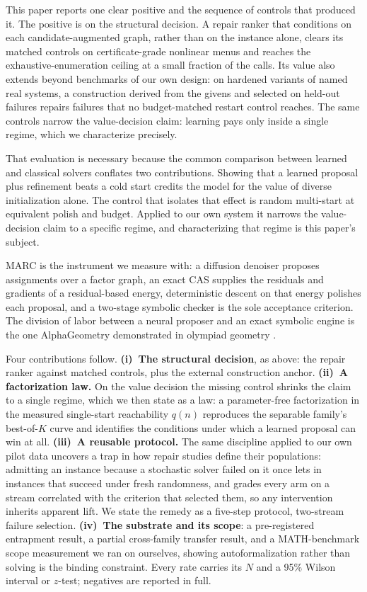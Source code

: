 \documentclass[letterpaper]{article} %
\begin{document}
This paper reports one clear positive and the sequence of controls that produced it. The
positive is on the structural decision. A repair ranker that conditions on each
candidate-augmented graph, rather than on the instance alone, clears its matched controls on
certificate-grade nonlinear menus and reaches the exhaustive-enumeration ceiling at a small
fraction of the calls. Its value also extends beyond benchmarks of our own design: on hardened variants of named
real systems, a construction derived from the givens and selected on held-out failures repairs
failures that no budget-matched restart control reaches. The same controls narrow the
value-decision claim: learning pays only inside a single regime, which we characterize precisely.

That evaluation is necessary because the common comparison between learned and classical
solvers conflates two contributions. Showing that a learned proposal plus refinement beats a cold
start credits the model for the value of diverse initialization alone. The control that
isolates that effect is random multi-start at equivalent polish and budget. Applied to our own
system it narrows the value-decision claim to a specific regime, and characterizing that
regime is this paper's subject.

MARC is the instrument we measure with: a diffusion denoiser proposes assignments over a
factor graph, an exact CAS supplies the residuals and gradients of a residual-based energy,
deterministic descent on that energy polishes each proposal, and a two-stage symbolic checker
is the sole acceptance criterion. The division of labor between a neural proposer and an exact
symbolic engine is the one AlphaGeometry demonstrated in olympiad geometry
\citep{trinh2024alphageometry}.

Four contributions follow. \textbf{(i)~The structural decision}, as above: the repair ranker
against matched controls, plus the external construction anchor.
\textbf{(ii)~A factorization law.} On the value decision the missing control shrinks the claim
to a single regime, which we then state as a law: a parameter-free factorization in the
measured single-start reachability $q(n)$ reproduces the separable family's best-of-$K$ curve
and identifies the conditions under which a learned proposal can win at all.
\textbf{(iii)~A reusable protocol.} The same discipline applied to our own pilot data uncovers
a trap in how repair studies define their populations: admitting an instance because a
stochastic solver failed on it once lets in instances that succeed under fresh randomness, and
grades every arm on a stream correlated with the criterion that selected them, so any
intervention inherits apparent lift. We state the remedy as a five-step protocol, two-stream
failure selection. \textbf{(iv)~The substrate and its scope}: a pre-registered entrapment result, a partial
cross-family transfer result, and a MATH-benchmark scope measurement we ran on ourselves,
showing autoformalization rather than solving is the binding constraint. Every rate carries
its $N$ and a 95\% Wilson interval or $z$-test; negatives are reported in full.
\end{document}
